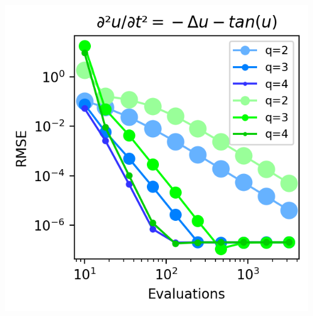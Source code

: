 \begin{center}
    \includegraphics[width=\columnwidth]{../images/solver_wave and big tan.png}
    \label{fig:wave big}
\end{center}


\ifdefined\COMPILINGFROMMAIN
\else    
    
\fi